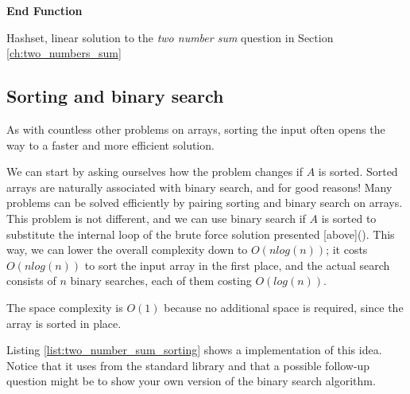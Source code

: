 \begin{algorithm}
	 
	   
	
	 \textbf{End Function}
		\caption{Hashset, linear solution to the \textit{two number sum} question in Section
		\label{algo:two_numbers_sum_hashset_wrong}
	\ref{ch:two_numbers_sum} }
\end{algorithm}


\subsection{Sorting and binary search}
\label{sect:two_number_problem_binary_search}

As with countless other problems on arrays, sorting the input often opens the
way to a faster and more efficient solution. 

We can start by asking ourselves how the problem changes if  $A$ is sorted. Sorted arrays are naturally associated with binary search, and for good reasons! Many problems can be solved efficiently by pairing sorting and binary search on arrays. 
This problem is not different, and we can use binary search if $A$ is sorted to substitute the internal loop of the brute force solution presented [above](). This way, we can  lower the overall complexity down to $O(n log(n))$; it costs
$O(n log(n))$ to sort the input array in the first place, and the actual search consists of $n$ binary
searches, each of them costing $O(log(n))$. 

The space complexity is $O(1)$ because no additional space is required, since the array is sorted in place.

Listing \ref{list:two_number_sum_sorting} shows a \CC implementation of this idea. Notice that it uses  from the \CC standard library and that a possible follow-up question might be to show your own version of the binary search algorithm.



